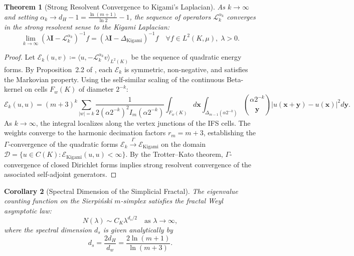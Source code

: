 \documentclass[11pt,a4paper]{article}
\theoremstyle{plain}
\newtheorem{theorem}{Theorem}[section]
\newtheorem{corollary}[theorem]{Corollary}
\theoremstyle{definition}
\theoremstyle{remark}
\numberwithin{equation}{section}
\begin{document}
\begin{theorem}[Strong Resolvent Convergence to Kigami's Laplacian]
\label{thm:kigami_convergence}
As $k \to \infty$ and setting $\alpha_k \to d_H - 1 = \frac{\ln(m+1)}{\ln 2} - 1$, the sequence of operators $\mathcal{L}_k^{\alpha_k}$ converges in the strong resolvent sense to the Kigami Laplacian:
\begin{equation}
\lim_{k \to \infty} \left(\lambda \mathbf{I} - \mathcal{L}_k^{\alpha_k}\right)^{-1} f = \left(\lambda \mathbf{I} - \Delta_{\text{Kigami}}\right)^{-1} f \quad \forall f \in L^2(K, \mu), \; \lambda > 0.
\end{equation}
\end{theorem}

\begin{proof}
Let $\mathcal{E}_k(u, v) \coloneqq \langle u, -\mathcal{L}_k^{\alpha_k} v \rangle_{L^2(K)}$ be the sequence of quadratic energy forms. By Proposition~2.2 of \cite{silvafilho2026waves}, each $\mathcal{E}_k$ is symmetric, non-negative, and satisfies the Markovian property.
Using the self-similar scaling of the continuous Beta-kernel on cells $F_w(K)$ of diameter $2^{-k}$:
\begin{equation}
\mathcal{E}_k(u, u) = (m+3)^k \sum_{|w|=k} \frac{1}{2(\alpha 2^{-k})^2 I_m(\alpha 2^{-k})} \int_{F_w(K)} d\mathbf{x} \int_{\Delta_{m-1}(\alpha 2^{-k})} \binom{\alpha 2^{-k}}{\mathbf{y}} |u(\mathbf{x}+\mathbf{y}) - u(\mathbf{x})|^2 d\mathbf{y}.
\end{equation}
As $k \to \infty$, the integral localizes along the vertex junctions of the IFS cells. The weights converge to the harmonic decimation factors $r_m = m+3$, establishing the $\Gamma$-convergence of the quadratic forms $\mathcal{E}_k \xrightarrow{\Gamma} \mathcal{E}_{\text{Kigami}}$ on the domain $\mathcal{D} = \{u \in C(K) : \mathcal{E}_{\text{Kigami}}(u, u) < \infty\}$. By the Trotter--Kato theorem, $\Gamma$-convergence of closed Dirichlet forms implies strong resolvent convergence of the associated self-adjoint generators.
\end{proof}

\begin{corollary}[Spectral Dimension of the Simplicial Fractal]
The eigenvalue counting function on the Sierpi\'nski $m$-simplex satisfies the fractal Weyl asymptotic law:
\begin{equation}
N(\lambda) \sim C_K \lambda^{d_s / 2} \quad \text{as } \lambda \to \infty,
\end{equation}
where the spectral dimension $d_s$ is given analytically by
\begin{equation}
d_s = \frac{2 d_H}{d_w} = \frac{2\ln(m+1)}{\ln(m+3)}.
\end{equation}
\end{corollary}
\end{document}
